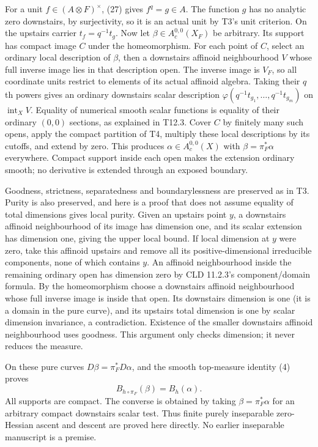 \documentclass[
  10pt,
]{article}
\begin{document}
For a unit \(f\in(A\otimes F)^\times\), (27) gives \(f^q=g\in A\). The
function \(g\) has no analytic zero downstairs, by surjectivity, so it
is an actual unit by T3's unit criterion. On the upstairs carrier
\(t_f=q^{-1}t_g\). Now let \(\beta\in A_c^{0,0}(X_F)\) be arbitrary. Its
support has compact image \(C\) under the homeomorphism. For each point
of \(C\), select an ordinary local description of \(\beta\), then a
downstairs affinoid neighbourhood \(V\) whose full inverse image lies in
that description open. The inverse image is \(V_F\), so all coordinate
units restrict to elements of its actual affinoid algebra. Taking their
\(q\)th powers gives an ordinary downstairs scalar description
\(\varphi(q^{-1}t_{g_1},\ldots,q^{-1}t_{g_m})\) on
\(\operatorname{int}_X V\). Equality of numerical smooth scalar
functions is equality of their ordinary \((0,0)\) sections, as explained
in T12.3. Cover \(C\) by finitely many such opens, apply the compact
partition of T4, multiply these local descriptions by its cutoffs, and
extend by zero. This produces \(\alpha\in A_c^{0,0}(X)\) with
\(\beta=\pi_F^*\alpha\) everywhere. Compact support inside each open
makes the extension ordinary smooth; no derivative is extended through
an exposed boundary.

Goodness, strictness, separatedness and boundarylessness are preserved
as in T3. Purity is also preserved, and here is a proof that does not
assume equality of total dimensions gives local purity. Given an
upstairs point \(y\), a downstairs affinoid neighbourhood of its image
has dimension one, and its scalar extension has dimension one, giving
the upper local bound. If local dimension at \(y\) were zero, take this
affinoid upstairs and remove all its positive-dimensional irreducible
components, none of which contains \(y\). An affinoid neighbourhood
inside the remaining ordinary open has dimension zero by CLD 11.2.3's
component/domain formula. By the homeomorphism choose a downstairs
affinoid neighbourhood whose full inverse image is inside that open. Its
downstairs dimension is one (it is a domain in the pure curve), and its
upstairs total dimension is one by scalar dimension invariance, a
contradiction. Existence of the smaller downstairs affinoid
neighbourhood uses goodness. This argument only checks dimension; it
never reduces the measure.

On these pure curves \(D\beta=\pi_F^*D\alpha\), and the smooth
top-measure identity (4) proves \[
             B_{h\circ\pi_F}(\beta)=B_h(\alpha).         \tag{28}
\] All supports are compact. The converse is obtained by taking
\(\beta=\pi_F^*\alpha\) for an arbitrary compact downstairs scalar test.
Thus finite purely inseparable zero-Hessian ascent and descent are
proved here directly. No earlier inseparable manuscript is a premise.
\end{document}
